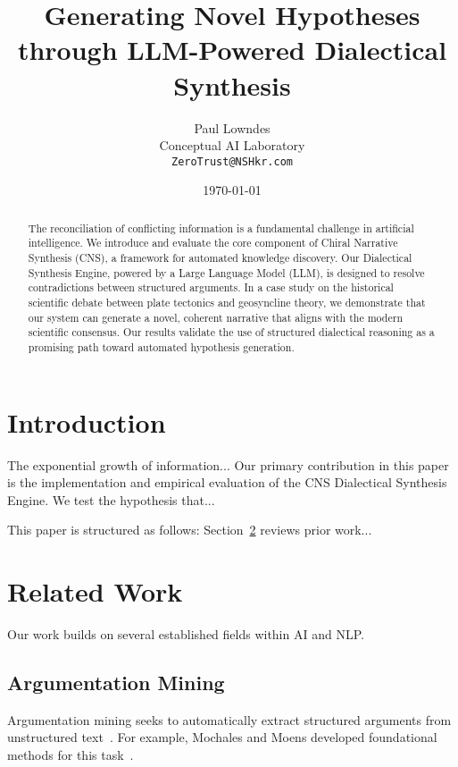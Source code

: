 \documentclass[twocolumn, 10pt]{article}
\title{\textbf{Generating Novel Hypotheses through LLM-Powered Dialectical Synthesis}}
\author{
    Paul Lowndes\\
    Conceptual AI Laboratory\\
    \texttt{ZeroTrust@NSHkr.com}
}
\date{\today}
\begin{document}
\maketitle

\begin{abstract}
    The reconciliation of conflicting information is a fundamental challenge in artificial intelligence. We introduce and evaluate the core component of Chiral Narrative Synthesis (CNS), a framework for automated knowledge discovery. Our Dialectical Synthesis Engine, powered by a Large Language Model (LLM), is designed to resolve contradictions between structured arguments. In a case study on the historical scientific debate between plate tectonics and geosyncline theory, we demonstrate that our system can generate a novel, coherent narrative that aligns with the modern scientific consensus. Our results validate the use of structured dialectical reasoning as a promising path toward automated hypothesis generation.
\end{abstract}


\section{Introduction}
\label{sec:intro}

The exponential growth of information...
Our primary contribution in this paper is the implementation and empirical evaluation of the CNS Dialectical Synthesis Engine. We test the hypothesis that...

This paper is structured as follows: Section~\ref{sec:related} reviews prior work...

\section{Related Work}
\label{sec:related}

Our work builds on several established fields within AI and NLP.

\subsection{Argumentation Mining}
Argumentation mining seeks to automatically extract structured arguments from unstructured text~\cite{lippi2016argumentation}. For example, Mochales and Moens developed foundational methods for this task~\cite{mochales2011argumentation}.
\end{document}
